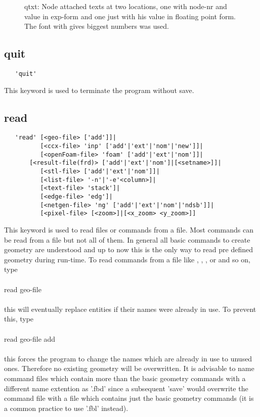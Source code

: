 \documentclass{article}
\begin{document}
\begin{figure}[h]
\caption{\label{qtxtp}qtxt: Node attached texts at two locations, one with node-nr and value in exp-form and one just with his value in floating point form. The font with gives biggest numbers was used.}
\end{figure}

\subsection{\label{quit}quit}
\begin{verbatim}
   'quit' 
\end{verbatim}
This keyword is used to terminate the program without save. 

\subsection{\label{read}read}
\begin{verbatim}
   'read' [<geo-file> ['add']]|
          [<ccx-file> 'inp' ['add'|'ext'|'nom'|'new']]|
          [<openFoam-file> 'foam' ['add'|'ext'|'nom']]|
       [<result-file(frd)> ['add'|'ext'|'nom']|[<setname>]]|
          [<stl-file> ['add'|'ext'|'nom']]|
          [<list-file> '-n'|'-e'<column>]|
          [<text-file> 'stack']|
          [<edge-file> 'edg']|
          [<netgen-file> 'ng' ['add'|'ext'|'nom'|'ndsb']]|
          [<pixel-file> [<zoom>]|[<x_zoom> <y_zoom>]]
\end{verbatim}
This keyword is used to read files or commands from a file. Most commands can be read from a file but not all of them. In general all basic commands to create geometry are understood and up to now this is the only way to read pre defined geometry during run-time. To read commands from a file like , , , or  and so on, type\\\\read geo-file\\\\this will eventually replace entities if their names were already in use. To prevent this, type\\\\read geo-file add\\\\this forces the program to change the names which are already in use to unused ones. Therefore no existing geometry will be overwritten. It is advisable to name command files which contain more than the basic geometry commands with a different name extention as '.fbd' since a subsequent 'save' would overwrite the command file with a file which contains just the basic geometry commands (it is a common practice to use '.fbl' instead). 
\end{document}

